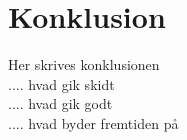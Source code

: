 \chapter{Konklusion}\label{ch:konklusion}
Her skrives konklusionen\\

.... hvad gik skidt\\
.... hvad gik godt\\
.... hvad byder fremtiden på\\
